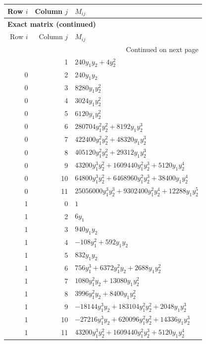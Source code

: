 \documentclass[10pt,a4paper]{article}
\begin{document}
{\small\setlength{\tabcolsep}{7pt}\begin{longtable}{rrp{125mm}}
\toprule Row $i$ & Column $j$ & $M_{ij}$\\\midrule\endfirsthead
\multicolumn{3}{l}{\textbf{Exact matrix (continued)}}\\
\toprule Row $i$ & Column $j$ & $M_{ij}$\\\midrule\endhead
\midrule\multicolumn{3}{r}{Continued on next page}\\\endfoot\bottomrule\endlastfoot
0 & 1 & $240 y_{1} y_{2} + 4 y_{2}^{2}$\\
0 & 2 & $240 y_{1} y_{2}$\\
0 & 3 & $8280 y_{1} y_{2}^{2}$\\
0 & 4 & $3024 y_{1} y_{2}^{2}$\\
0 & 5 & $6120 y_{1} y_{2}^{2}$\\
0 & 6 & $280704 y_{1}^{2} y_{2}^{2} + 8192 y_{1} y_{2}^{3}$\\
0 & 7 & $422400 y_{1}^{2} y_{2}^{2} + 48320 y_{1} y_{2}^{3}$\\
0 & 8 & $405120 y_{1}^{2} y_{2}^{2} + 29312 y_{1} y_{2}^{3}$\\
0 & 9 & $43200 y_{1}^{3} y_{2}^{2} + 1609440 y_{1}^{2} y_{2}^{3} + 5120 y_{1} y_{2}^{4}$\\
0 & 10 & $64800 y_{1}^{3} y_{2}^{2} + 6468960 y_{1}^{2} y_{2}^{3} + 38400 y_{1} y_{2}^{4}$\\
0 & 11 & $25056000 y_{1}^{3} y_{2}^{3} + 9302400 y_{1}^{2} y_{2}^{4} + 12288 y_{1} y_{2}^{5}$\\
1 & 0 & $1$\\
1 & 2 & $6 y_{1}$\\
1 & 3 & $940 y_{1} y_{2}$\\
1 & 4 & $- 108 y_{1}^{2} + 592 y_{1} y_{2}$\\
1 & 5 & $832 y_{1} y_{2}$\\
1 & 6 & $756 y_{1}^{3} + 6372 y_{1}^{2} y_{2} + 2688 y_{1} y_{2}^{2}$\\
1 & 7 & $1080 y_{1}^{2} y_{2} + 13080 y_{1} y_{2}^{2}$\\
1 & 8 & $3996 y_{1}^{2} y_{2} + 8400 y_{1} y_{2}^{2}$\\
1 & 9 & $- 18144 y_{1}^{3} y_{2} + 183104 y_{1}^{2} y_{2}^{2} + 2048 y_{1} y_{2}^{3}$\\
1 & 10 & $- 27216 y_{1}^{3} y_{2} + 620096 y_{1}^{2} y_{2}^{2} + 14336 y_{1} y_{2}^{3}$\\
1 & 11 & $43200 y_{1}^{3} y_{2}^{2} + 1609440 y_{1}^{2} y_{2}^{3} + 5120 y_{1} y_{2}^{4}$\\

\end{longtable}}
\end{document}
